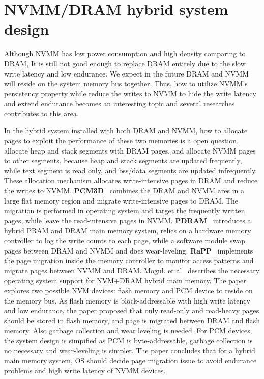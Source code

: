 \section{NVMM/DRAM hybrid system design} 
\label{sec:migration}

Although NVMM has low power consumption and high density comparing to DRAM,
It is still not good enough to replace DRAM entirely due to the slow write
latency and low endurance. We expect in the future DRAM and NVMM
will reside on the system memory bus together.
Thus, how to utilize NVMM's persistency property while reduce the writes to
NVMM to hide the write latency and extend endurance becomes an interesting
topic and several researches contributes to this area.

In the hybrid system installed with both DRAM and NVMM, how to allocate
pages to exploit the performance of these two memories is a open question.
\cite{pcmalloc} allocate heap and stack segments with DRAM pages, and allocate
NVMM pages to other segments, because heap and stack segments are updated
frequently, while text segment is read only, and bss/data segments are
updated infrequently. These allocation mechanism allocates write-intensive
pages in DRAM and reduce the writes to NVMM. \textbf{PCM3D}~\cite{pcm3d}
combines the DRAM
and NVMM ares in a large flat memory region and migrate write-intensive pages
to DRAM. The migration is performed in operating system and target the
frequently written pages, while leave the read-intensive pages in NVMM.
\textbf{PDRAM}~\cite{pdram} introduces a hybrid PRAM and DRAM main memory
system, 
relies on a hardware memory controller to log the write counts to each page,
while a software module swap pages between DRAM and NVMM and does wear-leveling.
\textbf{RaPP}~\cite{RaPP} implements the page migration inside the memory
controller
to monitor access patterns and migrate pages between NVMM and DRAM. 
Mogul. et al~\cite{Mogul} describes the necessary operating system support for
NVM+DRAM hybrid main memory. The paper explores two possible NVM devices:
flash memory and PCM device to reside on the memory bus. As flash memory
is block-addressable with high write latency and low endurance, the paper
proposed that only read-only and read-heavy pages should be stored in flash
memory, and page is migrated between DRAM and flash memory. Also garbage
collection and wear leveling is needed. For PCM devices, the system design
is simpified as PCM is byte-addressable, garbage collection is no necessary
and wear-leveling is simpler. The paper concludes that for a hybrid main
memory system, OS should decide page migration issue to avoid endurance
problems and high write latency of NVMM devices.


